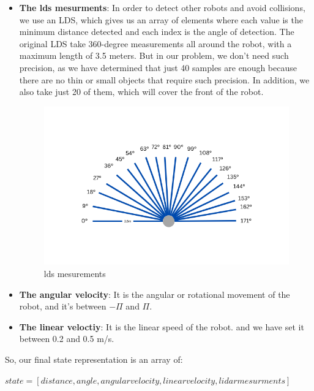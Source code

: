 \documentclass[12pt]{extarticle}
\begin{document}
\begin{itemize}
\item \textbf{The lds  mesurments}: 
In order to detect other robots and avoid collisions, we use an LDS, which gives us an array of elements where each value is the minimum distance detected and each index is the angle of detection.
The original LDS take 360-degree measurements all around the robot, with a maximum length of 3.5 meters. But in our problem, we don't need such precision, as we have determined that just 40 samples are enough because there are no thin or small objects that require such precision. In addition, we also take just 20 of them, which will cover the front of the robot.



 \begin{figure}[h]  
\centering
\includegraphics[scale=0.85]{lds3}
\caption[lds mesurement]{lds mesurements}
\end{figure}






\item \textbf{The angular velocity}: 
It is the angular or rotational movement of the robot, and it's between 
$ -\Pi $ and $\Pi$.

\item \textbf{The linear veloctiy}: 
It is the linear speed of the robot. and we have set it between 0.2 and 0.5 m/s.

\end{itemize}



So, our final state representation is an array of:

$state=[distance,angle,angular velocity,linear velocity,lidar mesurments]$
\end{document}
